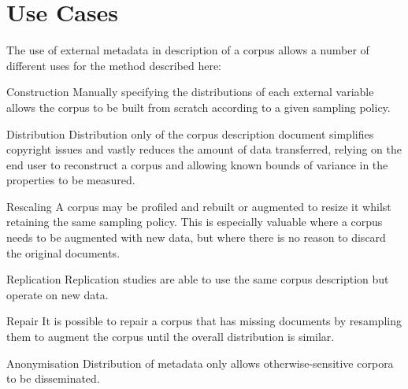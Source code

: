 

\section{Use Cases}
The use of external metadata in description of a corpus allows a number of different uses for the method described here:


\begin{itemizeTitle}
    \item[Construction] Manually specifying the distributions of each external variable allows the corpus to be built from scratch according to a given sampling policy.

    \item[Distribution] Distribution only of the corpus description document simplifies copyright issues and vastly reduces the amount of data transferred, relying on the end user to reconstruct a corpus and allowing known bounds of variance in the properties to be measured.

    \item[Rescaling] A corpus may be profiled and rebuilt or augmented to resize it whilst retaining the same sampling policy.  This is especially valuable where a corpus needs to be augmented with new data, but where there is no reason to discard the original documents.

    \item[Replication] Replication studies are able to use the same corpus description but operate on new data.

    \item[Repair] It is possible to repair a corpus that has missing documents by resampling them to augment the corpus until the overall distribution is similar.

    \item[Anonymisation] Distribution of metadata only allows otherwise-sensitive corpora to be disseminated.
\end{itemizeTitle}




